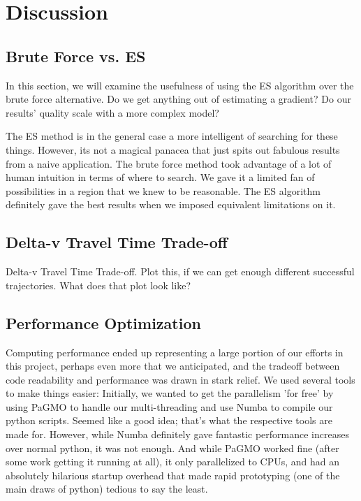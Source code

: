 
\chapter{Discussion}


\section{Brute Force vs. ES}
In this section, we will examine the usefulness of using the ES algorithm over the brute force alternative. Do we get anything out of estimating a gradient? Do our results’ quality scale with a more complex model?

The ES method is in the general case a more intelligent of searching for these things. However, its not a magical panacea that just spits out fabulous results from a naive application. The brute force method took advantage of a lot of human intuition in terms of where to search. We gave it a limited fan of possibilities in a region that we knew to be reasonable. The ES algorithm definitely gave the best results when we imposed equivalent limitations on it.

\section{Delta-v Travel Time Trade-off}
Delta-v Travel Time Trade-off. Plot this, if we can get enough different successful trajectories. What does that plot look like?

\section{Performance Optimization}
Computing performance ended up representing a large portion of our efforts in this project, perhaps even more that we anticipated, and the tradeoff between code readability and performance was drawn in stark relief. We used several tools to make things easier: Initially, we wanted to get the parallelism 'for free' by using PaGMO to handle our multi-threading and use Numba to compile our python scripts. Seemed like a good idea; that's what the respective tools are made for. However, while Numba definitely gave fantastic performance increases over normal python, it was not enough. And while PaGMO worked fine (after some work getting it running at all), it only parallelized to CPUs, and had an absolutely hilarious startup overhead that made rapid prototyping (one of the main draws of python) tedious to say the least. 

